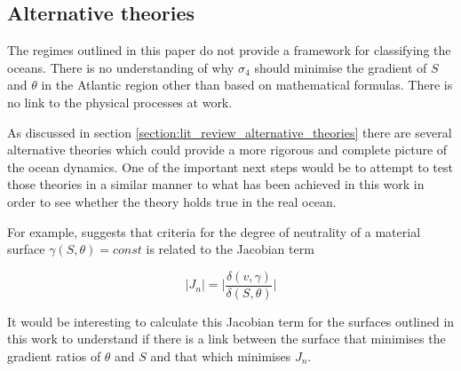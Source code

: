 \subsection{Alternative theories}

The regimes outlined in this paper do not provide a framework for classifying the oceans. There is no understanding of why $\sigma_4$ should minimise the gradient of $S$ and $\theta$ in the Atlantic region other than based on mathematical formulas. There is no link to the physical processes at work. 

As discussed in section \ref{section:lit_review_alternative_theories} there are several alternative theories which could provide a more rigorous and complete picture of the ocean dynamics. One of the important next steps would be to attempt to test those theories in a similar manner to what has been achieved in this work in order to see whether the theory holds true in the real ocean. 

For example, \citet{Tailleux2016} suggests that criteria for the degree of neutrality of a material surface $\gamma(S,\theta) = const$ is related to the Jacobian term 

\begin{equation}
    |J_n| = \bigg|\frac{\delta(v,\gamma)}{\delta(S,\theta)}\bigg|
\end{equation}

It would be interesting to calculate this Jacobian term for the surfaces outlined in this work to understand if there is a link between the surface that minimises the gradient ratios of $\theta$ and $S$ and that which minimises $J_n$.
